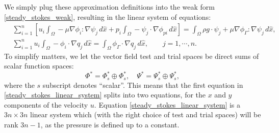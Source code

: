 We simply plug these approximation definitions into the weak form \eqref{steady_stokes_weak}, resulting in the
linear system of equations:
\begin{equation}\label{steady_stokes_linear_system}
\begin{split}
&\sum_{i=1}^n \left[u_i\int_\Omega -\mu\nabla\phi_i : \nabla\psi_j\,d\hat{x}
        + p_i\int_{\Omega} -\psi_j \cdot \nabla\phi_{pi}\,d\hat{x}\right]
    = \int_\Omega \rho g\cdot\psi_j
        + \mu\nabla\phi_\Gamma :\nabla\psi_j \,d\hat{x},\\
&\sum_{i=1}^n u_i \int_\Omega -\phi_i \cdot \nabla q_j \,d\hat{x}
    = \int_\Omega \phi_\Gamma \cdot \nabla q_j \,d\hat{x},
\quad\quad j=1,\cdots,n.
\end{split}
\end{equation}
To simplify matters, we let the vector field test and trial spaces be direct sums of scalar function spaces:
$$
    \Phi^* = \Phi^*_s \oplus \Phi^*_s,
    \quad
    \Psi^* = \Psi^*_s \oplus \Psi^*_s,
$$
where the $s$ subscript denotes ``scalar''. This means
that the first equation in \eqref{steady_stokes_linear_system} splits into
two equations, for the $x$ and $y$ components of the velocity $u$.
Equation \eqref{steady_stokes_linear_system} is a $3n \times 3n$ linear system which (with the right choice of test and trial spaces) will be rank $3n - 1$,
as the pressure is defined up to a constant.




